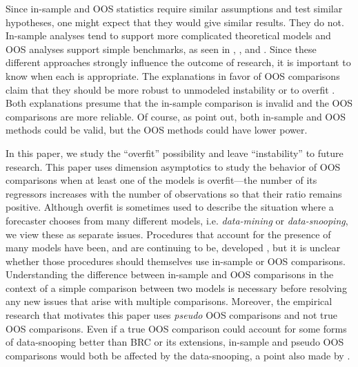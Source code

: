 \documentclass[12pt]{article}
\begin{document}
Since in-sample and OOS statistics require similar assumptions and
test similar hypotheses, one might expect that they would give similar
results.  They do not.  In-sample analyses tend to support more
complicated theoretical models and OOS analyses support simple
benchmarks, as seen in \citet{MeR:83}, \citet{StW:03}, and
\citet{GoW:08}.  Since these different approaches strongly influence
the outcome of research, it is important to know when each is
appropriate.  The explanations in favor of OOS comparisons claim
that they should be more robust to unmodeled instability
\citep{ClM:05,GiW:06,GiR:09,GiR:10} or to overfit
\citep{Mcc:98,Cla:04}.  Both explanations presume that the in-sample
comparison is invalid and the OOS comparisons are more reliable.  Of
course, as \citet{InK:04,InK:06} point out, both in-sample and OOS
methods could be valid, but the OOS methods could have lower power.

In this paper, we study the ``overfit'' possibility and leave
``instability'' to future research. This paper uses dimension
asymptotics to study the behavior of OOS comparisons when at least
one of the models is overfit---the number of its regressors
increases with the number of observations so that their ratio remains
positive.  Although overfit is sometimes used to describe the
situation where a forecaster chooses from many different models,
i.e. \emph{data-mining} or \emph{data-snooping}, we view these as
separate issues.  Procedures that account for the presence of many
models have been, and are continuing to be, developed \citep[see, for
example,][]{Whi:00,Han:05,RoW:05,HHK:10,ClM:12b}, but it is unclear
whether those procedures should themselves use in-sample or OOS
comparisons.  Understanding the difference between in-sample and OOS
comparisons in the context of a simple comparison between two models
is necessary before resolving any new issues that arise with multiple
comparisons. Moreover, the empirical research that motivates
this paper uses \emph{pseudo} OOS comparisons and not
true OOS comparisons.  Even if a true OOS comparison
could account for some forms of data-snooping better than
 BRC or its extensions, in-sample and pseudo
OOS comparisons would both be affected by the data-snooping, a
point also made by \citet{InK:04}.
\end{document}
